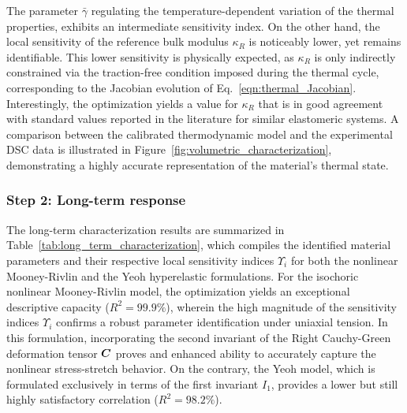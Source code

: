The parameter $\bar\gamma$ regulating the temperature-dependent variation of the thermal properties, exhibits an intermediate sensitivity index. On the other hand, the local sensitivity of the reference bulk modulus $\kappa_R$ is noticeably lower, yet remains identifiable. This lower sensitivity is physically expected, as $\kappa_R$ is only indirectly constrained via the traction-free condition imposed during the thermal cycle, corresponding to the Jacobian evolution of Eq.~\eqref{eqn:thermal_Jacobian}. Interestingly, the optimization yields a value for $\kappa_R$ that is in good agreement with standard values reported in the literature for similar elastomeric systems. A comparison between the calibrated thermodynamic model and the experimental DSC data is illustrated in Figure~\ref{fig:volumetric_characterization}, demonstrating a highly accurate representation of the material's thermal state.


\subsubsection{Step 2: Long-term response}

The long-term characterization results are summarized in Table~\ref{tab:long_term_characterization}, which compiles the identified material parameters and their respective local sensitivity indices $\Upsilon_i$ for both the nonlinear Mooney-Rivlin and the Yeoh hyperelastic formulations. For the isochoric nonlinear Mooney-Rivlin model, the optimization yields an exceptional descriptive capacity ($R^2 = 99.9\%$), wherein the high magnitude of the sensitivity indices $\Upsilon_i$ confirms a robust parameter identification under uniaxial tension. In this formulation, incorporating the second invariant of the Right Cauchy-Green deformation tensor $\boldsymbol{C}$ proves and enhanced ability to accurately capture the nonlinear stress-stretch behavior. On the contrary, the Yeoh model, which is formulated exclusively in terms of the first invariant $I_1$, provides a lower but still highly satisfactory correlation ($R^2 = 98.2\%$).


